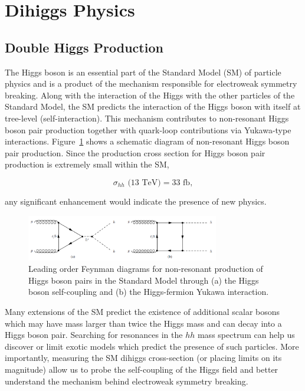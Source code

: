 \section{Dihiggs Physics}
\subsection{Double Higgs Production}
\label{sec:physics}

The Higgs boson is an essential part of the Standard Model (SM) of particle physics and is a product of the mechanism responsible for electroweak symmetry breaking. Along with the interaction of the Higgs with the other particles of the Standard Model, the SM predicts the interaction of the Higgs boson with itself at tree-level (self-interaction). This mechanism contributes to non-resonant Higgs boson pair production together with quark-loop contributions via Yukawa-type interactions. Figure~\ref{fig:nr_hh_production} shows a schematic diagram of non-resonant Higgs boson pair production. Since the production cross section for Higgs boson pair production is extremely small within the SM, 

\begin{equation*}
\sigma_{hh}\text{ (13 TeV)} = 33 \text{ fb},
\end{equation*}

any significant enhancement would indicate the presence of new physics.

\begin{figure}[!h] 
\begin{center}
\includegraphics*[width=0.75\textwidth] {dihiggsPhys/figures/nr-diHiggs-production.png}
\caption{Leading order Feynman diagrams for non-resonant production of Higgs
  boson pairs in the Standard Model through (a) the Higgs boson self-coupling
  and (b) the Higgs-fermion Yukawa interaction.} 
  \label{fig:nr_hh_production}
\end{center}
\end{figure}

Many extensions of the SM predict the existence of additional scalar bosons which may have mass larger than twice the Higgs mass and can decay into a Higgs boson pair. Searching for resonances in the $hh$ mass spectrum can help us discover or limit exotic models which predict the presence of such particles. More importantly, measuring the SM dihiggs cross-section (or placing limits on its magnitude) allow us to probe the self-coupling of the Higgs field and better understand the mechanism behind electroweak symmetry breaking.

